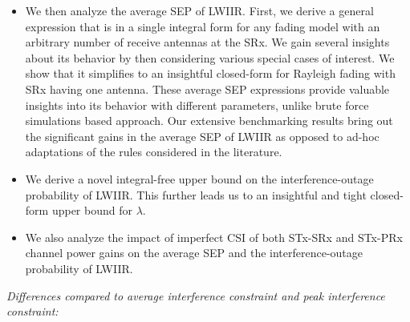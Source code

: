 \documentclass[12pt,draftcls,peerreview,onecolumn]{IEEEtran}
\newcommand{\lam}{\lambda}
\newcommand{\Nt}{{N_t}}
\begin{document}
\begin{itemize}
%
\item We then analyze the average SEP of LWIIR. First, we derive a general expression that is in a single integral form for any fading model with an arbitrary number of receive antennas at the SRx. We gain several insights about its behavior by then considering various special cases of interest. We show that it simplifies to an insightful closed-form for Rayleigh fading with SRx having one antenna. These average SEP expressions provide valuable insights into its behavior with different parameters, unlike brute force simulations based approach. Our extensive benchmarking results bring out the significant gains in the average SEP of LWIIR as opposed to ad-hoc adaptations of the rules considered in the literature. 
% 
\item We derive a novel integral-free upper bound on the interference-outage probability of LWIIR. This further leads us to an insightful and tight closed-form upper bound for $\lam$.
% 
%

\item We also analyze the impact of imperfect CSI of both STx-SRx and STx-PRx channel power gains on the average SEP and the interference-outage probability of LWIIR.

\end{itemize}


{\em Differences compared to average interference constraint and peak interference constraint: }  
\end{document}

